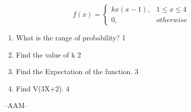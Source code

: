 \documentclass[12pt]{article}
\begin{document}
\begin{enumerate}
$$
  f(x) =
\begin{cases}
kx(x-1),  & 1 \le x \le 4 \\
0, & otherwise
\end{cases}
$$

  \begin{enumerate}
    \item
	What is the range of probability? \hfill 1
    \item
    	Find the value of k \hfill 2
    \item
    	Find the Expectation of the function. \hfill 3
     \item
     	Find V(3X+2).  \hfill 4
  \end{enumerate}




\end{enumerate}
 \vspace{2.5cm}

\begin{center}

  \vfill
  --AAM--
\end{center}
\end{document}
